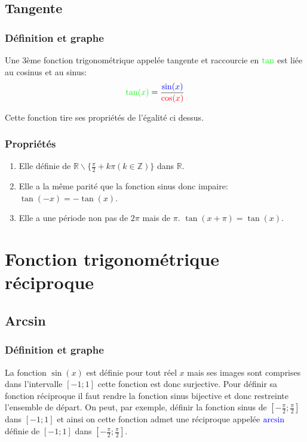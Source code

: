 \documentclass[12pt,a4paper]{report}
\begin{document}
	\pagebreak
	\subsection*{Tangente}
	\subsubsection*{Définition et graphe}
	Une 3ème fonction trigonométrique appelée tangente et raccourcie en $\color{green}\tan$ est liée au cosinus et au sinus: \[\color{green}\tan(x) \color{black}=\dfrac{\color{blue}\sin(x)}{\color{red}\cos(x)}\]
	
	
	Cette fonction tire ses propriétés de l'égalité ci dessus.
	\subsubsection*{Propriétés}
	\begin{enumerate}
		\item Elle définie de $\mathbb{R} \backslash \{\frac{\pi}{2}+k\pi (k \in \mathbb{Z})\} $ dans $\mathbb{R}$.
		\item Elle a la même parité que la fonction sinus donc impaire: $\tan(-x)=-\tan(x)$.
		\item Elle a une période non pas de $2\pi$ mais de $\pi$. $\tan(x+\pi)=\tan(x)$.
	\end{enumerate}

	\pagebreak
	\section*{Fonction trigonométrique réciproque}
	\subsection*{Arcsin}
	\subsubsection*{Définition et graphe}
	La fonction $\sin(x)$ est définie pour tout réel $x$ mais ses images sont comprises dans l'intervalle $[-1;1]$ cette fonction est donc surjective. Pour définir sa fonction réciproque il faut rendre la fonction sinus bijective et donc restreinte l'ensemble de départ. On peut, par exemple, définir la fonction sinus de $[-\frac{\pi}{2};\frac{\pi}{2}]$ dans $[-1;1]$ et ainsi on cette fonction admet une réciproque appelée $\color{blue}\arcsin$ définie de $[-1;1]$ dans $[-\frac{\pi}{2};\frac{\pi}{2}]$.
	
\end{document}
